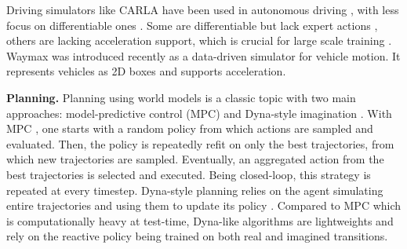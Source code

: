 Driving simulators like CARLA \cite{dosovitskiy2017carla, martinez2017beyond} have been used in autonomous driving \cite{codevilla2018end, zhang2019vr}, with less focus on differentiable ones \cite{lavington2024torchdriveenv}. Some are differentiable but lack expert actions \cite{lavington2024torchdriveenv}, others are lacking acceleration support, which is crucial for large scale training \cite{sun2022intersim, li2022metadrive, vinitsky2022nocturne}. Waymax \cite{gulino2024waymax} was introduced recently as a data-driven simulator for vehicle motion. It represents vehicles as 2D boxes and supports acceleration. 

\textbf{Planning.} Planning using world models \cite{schrittwieser2020mastering, ha2018world, moerland2023model} is a classic topic with two main approaches: model-predictive control (MPC) \cite{bertsekas2012dynamic} and Dyna-style imagination \cite{sutton1991dyna}. With MPC \cite{arroyo2022reinforced, romero2024actor, karnchanachari2020practical}, one starts with a random policy from which actions are sampled and evaluated. Then, the policy is repeatedly refit on only the best trajectories, from which new trajectories are sampled. Eventually, an aggregated action from the best trajectories is selected and executed. Being closed-loop, this strategy is repeated at every timestep. Dyna-style planning relies on the agent simulating entire trajectories and using them to update its policy \cite{hafner2019dream, hafner2020mastering, hafner2023mastering}. Compared to MPC which is computationally heavy at test-time, Dyna-like algorithms are lightweights and rely on the reactive policy being trained on both real and imagined transitions.